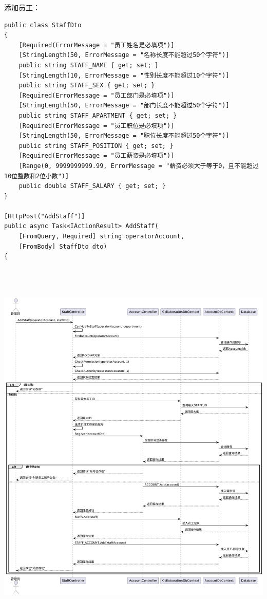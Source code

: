 \documentclass[]{article}
\let\oldincludegraphics\includegraphics
\renewcommand{\includegraphics}[2][]{%
  \begin{center}\oldincludegraphics[#1]{#2}\end{center}%
}
\begin{document}
添加员工：
\begin{verbatim}
public class StaffDto
{
    [Required(ErrorMessage = "员工姓名是必填项")]
    [StringLength(50, ErrorMessage = "名称长度不能超过50个字符")]
    public string STAFF_NAME { get; set; }
    [StringLength(10, ErrorMessage = "性别长度不能超过10个字符")]
    public string STAFF_SEX { get; set; }
    [Required(ErrorMessage = "员工部门是必填项")]
    [StringLength(50, ErrorMessage = "部门长度不能超过50个字符")]
    public string STAFF_APARTMENT { get; set; }
    [Required(ErrorMessage = "员工职位是必填项")]
    [StringLength(50, ErrorMessage = "职位长度不能超过50个字符")]
    public string STAFF_POSITION { get; set; }
    [Required(ErrorMessage = "员工薪资是必填项")]
    [Range(0, 9999999999.99, ErrorMessage = "薪资必须大于等于0，且不能超过10位整数和2位小数")]
    public double STAFF_SALARY { get; set; }
}

[HttpPost("AddStaff")]
public async Task<IActionResult> AddStaff(
    [FromQuery, Required] string operatorAccount,
    [FromBody] StaffDto dto)
{
\end{verbatim}

\includegraphics[width=6.27778in,height=7.20903in]{media/media/image15.png}
\end{document}
